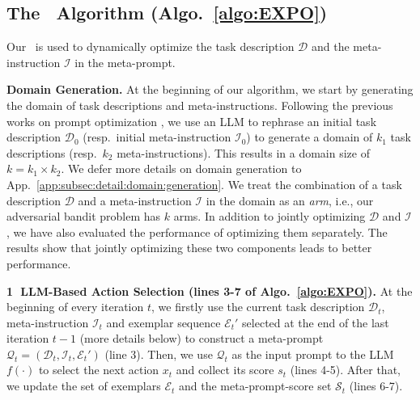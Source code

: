 \subsection{The \alg~Algorithm (Algo.~\ref{algo:EXPO})}
\label{subsec:expo}
Our \alg~is used to dynamically optimize the task description $\mathcal{D}$ and the meta-instruction $\mathcal{I}$ in the meta-prompt. 

\textbf{Domain Generation.}
At the beginning of our algorithm, we start by generating the domain of task descriptions and meta-instructions. Following the previous works on prompt optimization \cite{zhou2023large,lin2024prompt,lin2023instinct}, we use an LLM to rephrase an initial task description $\mathcal{D}_0$ (resp.~initial meta-instruction $\mathcal{I}_0$) to generate a domain of $k_1$ task descriptions (resp.~$k_2$ meta-instructions). This results in a domain size of $k=k_1\times k_2$.
We defer more details on domain generation to App.~\ref{app:subsec:detail:domain:generation}.
We treat the combination of a task description $\mathcal{D}$ and a meta-instruction $\mathcal{I}$ in the domain as an \emph{arm}, i.e., our adversarial bandit problem has $k$ arms.
In addition to jointly optimizing $\mathcal{D}$ and $\mathcal{I}$,
we have also evaluated the performance of optimizing them separately. The results 
show that jointly optimizing these two components leads to better performance.

\textbf{{\textcircled{\scriptsize 1}} LLM-Based Action Selection (lines 3-7 of Algo.~\ref{algo:EXPO}).}
At the beginning of every iteration $t$, we firstly use the current
task description $\mathcal{D}_t$, meta-instruction $\mathcal{I}_t$ and exemplar sequence $\mathcal{E}_t'$ selected at the end of the last iteration $t-1$ (more details below) to construct a meta-prompt $\mathcal{Q}_t = (\mathcal{D}_t, \mathcal{I}_t, \mathcal{E}_t')$ (line 3). 
Then, we use $\mathcal{Q}_t$ as the input prompt to the LLM $f(\cdot)$ to select the next action $x_t$ and collect its score $s_t$ (lines 4-5). After that, we update the set of exemplars $\mathcal{E}_t$ and the meta-prompt-score set $\mathcal{S}_{t}$ (lines 6-7).

